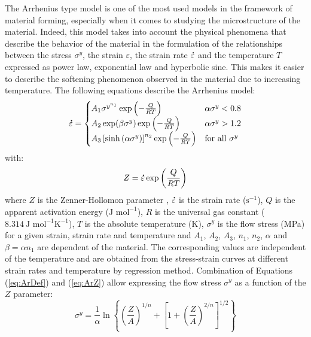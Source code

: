 \documentclass[twoside,english,1p,final,sort&compress]{elsarticle}
\theoremstyle{plain}
\newcommand{\mdot}[1]{\accentset{\mbox{\bfseries .}}{#1}}
\newcommand{\ps}{\text{s}^{-1}}
\begin{document}
The Arrhenius type model \cite{Sellars-1966} is one of the most used models in the framework of material forming, especially when it comes to studying the microstructure of the material.
Indeed, this model takes into account the physical phenomena that describe the behavior of the material in the formulation of the relationships between the stress $\sigma^y$, the strain $\varepsilon$, the strain rate $\mdot\varepsilon$ and the temperature $T$ expressed as power law, exponential law and hyperbolic sine.
This makes it easier to describe the softening phenomenon observed in the material due to increasing temperature.
The following equations describe the Arrhenius model:
\begin{equation}
\mdot\varepsilon =
\begin{cases}
A_1 \sigma^{y^{n_1}} \exp{\left(-\frac{Q}{RT}\right)} & \alpha\sigma^y < 0.8\\
A_2 \exp(\beta\sigma^y) \exp{\left(-\frac{Q}{RT}\right)} & \alpha\sigma^y > 1.2\\
A_3 \left[\sinh{\left(\alpha\sigma^y\right)}\right]^{n_2} \exp{\left(-\frac{Q}{RT}\right)} & \text{for all }\sigma^y
\end{cases}
\label{eq:ArDef}
\end{equation}
with:
\begin{equation}
Z = \mdot\varepsilon \exp{\left(\frac{Q}{RT}\right)} \label{eq:ArZ}
\end{equation}
where $Z$ is the Zenner-Hollomon parameter \cite{Zener-1944}, $\mdot\varepsilon$ is the strain rate ($\ps$), $Q$ is the apparent activation energy ($\text{J~mol}^{-1}$), $R$ is the universal gas constant ($8.314~\text{J~mol}^{-1} \text{K}^{-1}$), $T$ is the absolute temperature (K), $\sigma^y$ is the flow stress (MPa) for a given strain, strain rate and temperature and $A_1$, $A_2$, $A_3$, $n_1$, $n_2$, $\alpha$ and $\beta=\alpha n_1$ are dependent of the material.
The corresponding values are independent of the temperature and are obtained from the stress-strain curves at different strain rates and temperature by regression method.
Combination of Equations (\ref{eq:ArDef}) and (\ref{eq:ArZ}) allow expressing the flow stress $\sigma^y$ as a function of the $Z$ parameter:
\begin{equation}
\sigma^y = \frac{1}{\alpha} \ln\left\{\left(\frac{Z}{A}\right)^{1/n} + \left[1 + \left(\frac{Z}{A}\right)^{2/n}\right]^{1/2}\right\}
\end{equation}
\end{document}
